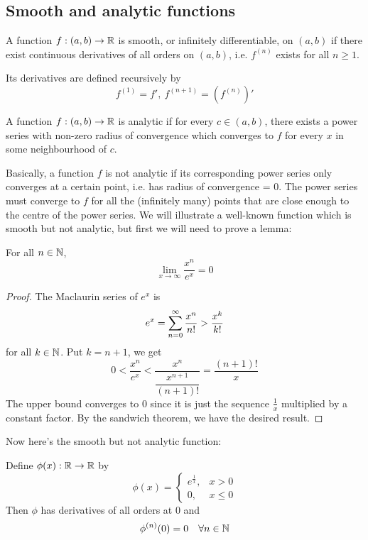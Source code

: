 \subsection{Smooth and analytic functions}
\begin{definition}
  A function $f: (a, b) \to \R$ is smooth, or infinitely differentiable, on $(a, b)$ if there exist continuous derivatives of all orders on $(a, b)$, i.e. $f ^ {(n)}$ exists for all $n \geq 1$.

  Its derivatives are defined recursively by
  \[
    f ^ {(1)} = f', \ f ^ {(n + 1)} = (f ^ {(n)})'
  \]
\end{definition}
\begin{definition}
  A function $f: (a, b) \to \R$ is analytic if for every $c \in (a, b)$, there exists a power series with non-zero radius of convergence which converges to $f$ for every $x$ in some neighbourhood of $c$.
\end{definition}
Basically, a function $f$ is not analytic if its corresponding power series only converges at a certain point, i.e. has radius of convergence = 0. The power series must converge to $f$ for all the (infinitely many) points that are close enough to the centre of the power series. We will illustrate a well-known function which is smooth but not analytic, but first we will need to prove a lemma:
\begin{lemma}
  \label{lemma:x^n/e^x}
  For all $n \in \N$, 
  \[
    \lim_{x \to \infty} \frac{x ^ n}{e ^ x} = 0
  \]
\end{lemma}
\begin{proof}
  The Maclaurin series of $e ^ x$ is
  \[
    e ^ x = \sumto[0]{n}{\infty} \frac{x ^ n}{n!} > \frac{x ^ k}{k!}
  \]
  for all $k \in \N$. Put $k = n + 1$, we get
  \[
    0 < \frac{x ^ n}{e ^ x} < \frac{x ^ n}{\dfrac{x ^ {n + 1}}{(n + 1)!}} = \frac{(n + 1)!}{x}
  \]
  The upper bound converges to 0 since it is just the sequence $\frac{1}{x}$ multiplied by a constant factor. By the sandwich theorem, we have the desired result.
\end{proof}
Now here's the smooth but not analytic function:
\begin{prop}
  \label{prop:phi-derivatives}
  Define $\phi(x): \R \to \R$ by
  \[
    \phi(x) =
    \begin{cases}
      e ^ \frac{1}{x}, & x > 0 \\
      0, & x \leq 0 
    \end{cases}
  \]
  Then $\phi$ has derivatives of all orders at 0 and
  \[
    \phi ^ {(n)} (0) = 0 \quad \forall n \in \N
  \]
\end{prop}
